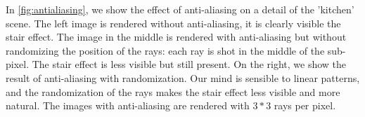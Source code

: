 \documentclass[tikz,14pt,fleqn]{article}
\begin{document}
In \autoref{fig:antialiasing}, we show the effect of anti-aliasing on a detail of the 'kitchen' scene.
The left image is rendered without anti-aliasing, it is clearly visible the stair effect.
The image in the middle is rendered with anti-aliasing but without randomizing the position of the rays: each ray is shot in the middle of the sub-pixel.
The stair effect is less visible but still present.
On the right, we show the result of anti-aliasing with randomization. Our mind is sensible to linear patterns, and the randomization of the rays makes the stair effect less visible and more natural.
The images with anti-aliasing are rendered with $3*3$ rays per pixel.
\end{document}
